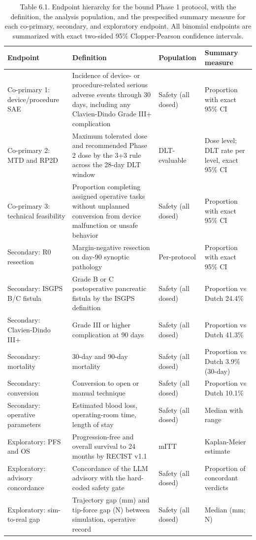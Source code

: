 \begin{table}[t]
\caption{Table 6.1. Endpoint hierarchy for the bound Phase 1 protocol, with the
definition, the analysis population, and the prespecified summary measure for each
co-primary, secondary, and exploratory endpoint. All binomial endpoints are
summarized with exact two-sided 95\% Clopper-Pearson confidence intervals.}
\label{tab:sec06-endpoints}
\centering
\begin{tabularx}{\textwidth}{L{3.0cm} Y L{2.6cm} L{2.6cm}}
\toprule
\textbf{Endpoint} & \textbf{Definition} & \textbf{Population} & \textbf{Summary measure} \\
\midrule
Co-primary 1: device/procedure SAE & Incidence of device- or procedure-related serious adverse events through 30 days, including any Clavien-Dindo Grade III+ complication & Safety (all dosed) & Proportion with exact 95\% CI \\
Co-primary 2: MTD and RP2D & Maximum tolerated dose and recommended Phase 2 dose by the 3+3 rule across the 28-day DLT window & DLT-evaluable & Dose level; DLT rate per level, exact 95\% CI \\
Co-primary 3: technical feasibility & Proportion completing assigned operative tasks without unplanned conversion from device malfunction or unsafe behavior & Safety (all dosed) & Proportion with exact 95\% CI \\
Secondary: R0 resection & Margin-negative resection on day-90 synoptic pathology & Per-protocol & Proportion with exact 95\% CI \\
Secondary: ISGPS B/C fistula & Grade B or C postoperative pancreatic fistula by the ISGPS definition & Safety (all dosed) & Proportion vs Dutch 24.4\% \\
Secondary: Clavien-Dindo III+ & Grade III or higher complication at 90 days & Safety (all dosed) & Proportion vs Dutch 41.3\% \\
Secondary: mortality & 30-day and 90-day mortality & Safety (all dosed) & Proportion vs Dutch 3.9\% (30-day) \\
Secondary: conversion & Conversion to open or manual technique & Safety (all dosed) & Proportion vs Dutch 10.1\% \\
Secondary: operative parameters & Estimated blood loss, operating-room time, length of stay & Safety (all dosed) & Median with range \\
Exploratory: PFS and OS & Progression-free and overall survival to 24 months by RECIST v1.1 & mITT & Kaplan-Meier estimate \\
Exploratory: advisory concordance & Concordance of the LLM advisory with the hard-coded safety gate & Safety (all dosed) & Proportion of concordant verdicts \\
Exploratory: sim-to-real gap & Trajectory gap (mm) and tip-force gap (N) between simulation, operative record & Safety (all dosed) & Median (mm; N) \\
\bottomrule
\end{tabularx}
\end{table}

